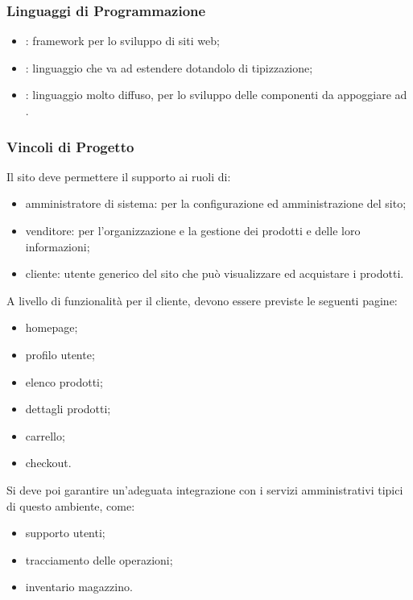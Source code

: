 \documentclass[]{article}
\begin{document}
			\subsubsection{Linguaggi di Programmazione}
			\begin{itemize}
				\item {}: framework per lo sviluppo  di siti web;
				\item {}: linguaggio che va ad estendere  dotandolo di tipizzazione;
				\item {}: linguaggio molto diffuso, per lo sviluppo delle componenti  da appoggiare ad .
			\end{itemize}


			\subsubsection{Vincoli di Progetto}
			Il sito deve permettere il supporto ai ruoli di:
			\begin{itemize}
			    \item amministratore di sistema: per la configurazione ed amministrazione del sito;
			    \item venditore: per l'organizzazione e la gestione dei prodotti e delle loro informazioni;
			    \item cliente: utente generico del sito che può visualizzare ed acquistare i prodotti.
			\end{itemize}
		A livello di funzionalità per il cliente, devono essere previste le seguenti pagine:
        \begin{itemize}
            \item homepage;
            \item profilo utente;
            \item elenco prodotti;
            \item dettagli prodotti;
            \item carrello;
            \item checkout.
        \end{itemize}
		Si deve poi garantire un'adeguata integrazione con i servizi amministrativi tipici di questo ambiente, come:
        \begin{itemize}
            \item supporto utenti;
            \item tracciamento delle operazioni;
            \item inventario magazzino.
        \end{itemize}
\end{document}
